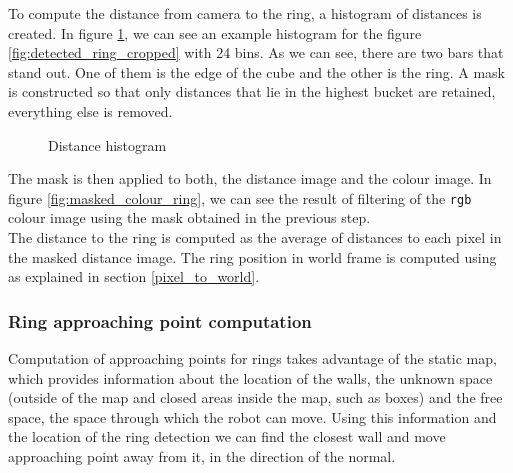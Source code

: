 \documentclass[12pt,a4paper]{article}
\begin{document}
	To compute the distance from camera to the ring, a histogram of distances is created. In figure \ref{fig:distance_histogram}, we can see an example histogram for the figure \ref{fig:detected_ring_cropped} with 24 bins. As we can see, there are two bars that stand out. One of them is the edge of the cube and the other is the ring. A mask is constructed so that only distances that lie in the highest bucket are retained, everything else is removed. \\
	
	\begin{figure}[H]
		\centering
		\caption{Distance histogram}
		\label{fig:distance_histogram}
	\end{figure}

	The mask is then applied to both, the distance image and the colour image. In figure \ref{fig:masked_colour_ring}, we can see the result of filtering of the \texttt{rgb} colour image using the mask obtained in the previous step. \\

	The distance to the ring is computed as the average of distances to each pixel in the masked distance image. The ring position in world frame is computed using as explained in section \ref{pixel_to_world}. \\

	\subsubsection{Ring approaching point computation}
	Computation of approaching points for rings takes advantage of the static map, which provides information about the location of the walls, the unknown space (outside of the map and closed areas inside the map, such as boxes) and the free space, the space through which the robot can move. Using this information and the location of the ring detection we can find the closest wall and move approaching point away from it, in the direction of the normal. \\
\end{document}
